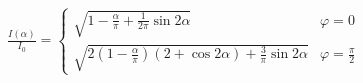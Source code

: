 \documentclass{article}
\begin{document}
\colorbox{hellmagenta}{%
\parbox{\linewidth-2\fboxsep}{%
	\begin{align}
		\frac{I(\alpha )}{I_{0}}=%
			\begin{cases}
				\sqrt{1-\frac{\alpha}{\pi}+\frac{1}{2\pi}\sin 2\alpha}
					& \varphi =0\\[0.4cm]
				\sqrt{2\left(1-\frac{\alpha}{\pi}\right)%
					\left(2+\cos 2\alpha \right)+\frac{3}{\pi}\sin 2\alpha}
					& \varphi =\frac{\pi}{2}
			\end{cases}
	\end{align}%
}}
\end{document}
